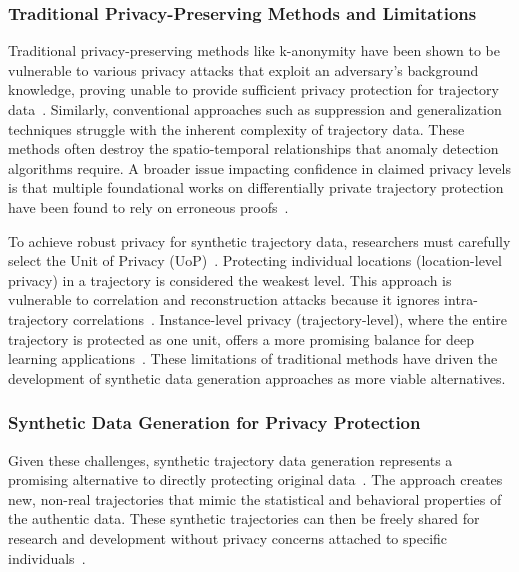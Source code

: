 \documentclass[runningheads]{llncs}
\begin{document}
\subsubsection{Traditional Privacy-Preserving Methods and Limitations}

Traditional privacy-preserving methods like k-anonymity have been shown to be vulnerable to various privacy attacks that exploit an adversary's background knowledge, proving unable to provide sufficient privacy protection for trajectory data~\cite{Chen2011DPTP,Buchholz2022RAoPT,Jin2023SurveyExpStudy}. Similarly, conventional approaches such as suppression and generalization techniques struggle with the inherent complexity of trajectory data. These methods often destroy the spatio-temporal relationships that anomaly detection algorithms require. A broader issue impacting confidence in claimed privacy levels is that multiple foundational works on differentially private trajectory protection have been found to rely on erroneous proofs~\cite{Buchholz2024SoK,Primault2014DPLPP,Errounda2019AnalysisDPLocation}.

To achieve robust privacy for synthetic trajectory data, researchers must carefully select the Unit of Privacy (UoP)~\cite{Buchholz2024SoK,Primault2019LongRoad}. Protecting individual locations (location-level privacy) in a trajectory is considered the weakest level. This approach is vulnerable to correlation and reconstruction attacks because it ignores intra-trajectory correlations~\cite{Buchholz2024SoK,Buchholz2022RAoPT,Primault2014DPLPP,Errounda2019AnalysisDPLocation}. Instance-level privacy (trajectory-level), where the entire trajectory is protected as one unit, offers a more promising balance for deep learning applications~\cite{Buchholz2024SoK}. These limitations of traditional methods have driven the development of synthetic data generation approaches as more viable alternatives.

\subsubsection{Synthetic Data Generation for Privacy Protection}

Given these challenges, synthetic trajectory data generation represents a promising alternative to directly protecting original data~\cite{Buchholz2024SoK,Rao2021LSTMTrajGAN,Liu2018TrajGANs}. The approach creates new, non-real trajectories that mimic the statistical and behavioral properties of the authentic data. These synthetic trajectories can then be freely shared for research and development without privacy concerns attached to specific individuals~\cite{Rao2021LSTMTrajGAN,Liu2018TrajGANs,Qu2020GANs5G}.
\end{document}
